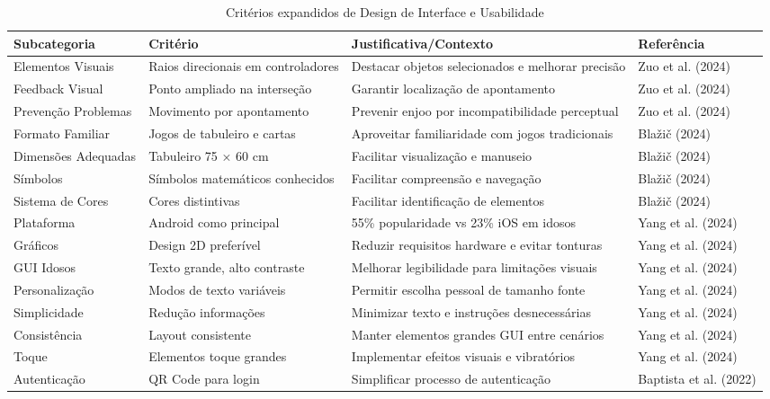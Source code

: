 \begin{table}[H]
\centering
\caption{Critérios expandidos de Design de Interface e Usabilidade}
\label{tab:interface_usabilidade_expandida}
\begin{tabular}{p{2.5cm}p{3.5cm}p{4.5cm}p{2.5cm}}
\hline
\textbf{Subcategoria} & \textbf{Critério} & \textbf{Justificativa/Contexto} & \textbf{Referência} \\ \hline
Elementos Visuais & Raios direcionais em controladores & Destacar objetos selecionados e melhorar precisão & Zuo et al. (2024) \\
Feedback Visual & Ponto ampliado na interseção & Garantir localização de apontamento & Zuo et al. (2024) \\
Prevenção Problemas & Movimento por apontamento & Prevenir enjoo por incompatibilidade perceptual & Zuo et al. (2024) \\
Formato Familiar & Jogos de tabuleiro e cartas & Aproveitar familiaridade com jogos tradicionais & Blažič (2024) \\
Dimensões Adequadas & Tabuleiro 75 × 60 cm & Facilitar visualização e manuseio & Blažič (2024) \\
Símbolos & Símbolos matemáticos conhecidos & Facilitar compreensão e navegação & Blažič (2024) \\
Sistema de Cores & Cores distintivas & Facilitar identificação de elementos & Blažič (2024) \\
Plataforma & Android como principal & 55\% popularidade vs 23\% iOS em idosos & Yang et al. (2024) \\
Gráficos & Design 2D preferível & Reduzir requisitos hardware e evitar tonturas & Yang et al. (2024) \\
GUI Idosos & Texto grande, alto contraste & Melhorar legibilidade para limitações visuais & Yang et al. (2024) \\
Personalização & Modos de texto variáveis & Permitir escolha pessoal de tamanho fonte & Yang et al. (2024) \\
Simplicidade & Redução informações & Minimizar texto e instruções desnecessárias & Yang et al. (2024) \\
Consistência & Layout consistente & Manter elementos grandes GUI entre cenários & Yang et al. (2024) \\
Toque & Elementos toque grandes & Implementar efeitos visuais e vibratórios & Yang et al. (2024) \\
Autenticação & QR Code para login & Simplificar processo de autenticação & Baptista et al. (2022) \\

\end{tabular}
\end{table}
